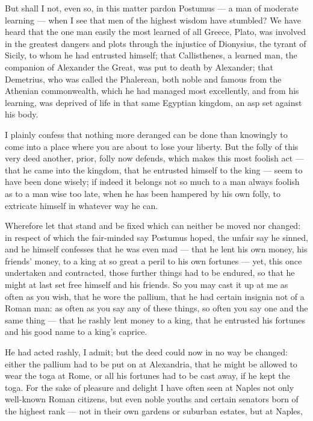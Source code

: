  But shall I not, even so, in this matter pardon Postumus --- a man of moderate learning --- when I see that men of the highest wisdom have stumbled? We have heard that the one man easily the most learned of all Greece, Plato, was involved in the greatest dangers and plots through the injustice of Dionysius, the tyrant of Sicily, to whom he had entrusted himself; that Callisthenes, a learned man, the companion of Alexander the Great, was put to death by Alexander; that Demetrius, who was called the Phalerean, both noble and famous from the Athenian commonwealth, which he had managed most excellently, and from his learning, was deprived of life in that same Egyptian kingdom, an asp set against his body.

 I plainly confess that nothing more deranged can be done than knowingly to come into a place where you are about to lose your liberty. But the folly of this very deed another, prior, folly now defends, which makes this most foolish act --- that he came into the kingdom, that he entrusted himself to the king --- seem to have been done wisely; if indeed it belongs not so much to a man always foolish as to a man wise too late, when he has been hampered by his own folly, to extricate himself in whatever way he can.

 Wherefore let that stand and be fixed which can neither be moved nor changed: in respect of which the fair-minded say Postumus hoped, the unfair say he sinned, and he himself confesses that he was even mad --- that he lent his own money, his friends' money, to a king at so great a peril to his own fortunes --- yet, this once undertaken and contracted, those further things had to be endured, so that he might at last set free himself and his friends. So you may cast it up at me as often as you wish, that he wore the pallium, that he had certain insignia not of a Roman man: as often as you say any of these things, so often you say one and the same thing --- that he rashly lent money to a king, that he entrusted his fortunes and his good name to a king's caprice.

 He had acted rashly, I admit; but the deed could now in no way be changed: either the pallium had to be put on at Alexandria, that he might be allowed to wear the toga at Rome, or all his fortunes had to be cast away, if he kept the toga. For the sake of pleasure and delight I have often seen at Naples not only well-known Roman citizens, but even noble youths and certain senators born of the highest rank --- not in their own gardens or suburban estates, but at Naples,

